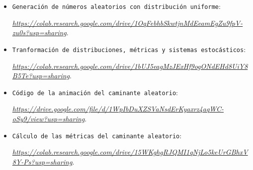\documentclass[11pt]{article} %
\begin{document}
\begin{itemize}
	\item \texttt{Generación de números aleatorios con distribución uniforme}:
	
	\href{https://colab.research.google.com/drive/1OqFebhbSkwtjnMdEeamEgZu9fpV-zu0s?usp=sharing}{\textit{https://colab.research.google.com/drive/1OqFebhbSkwtjnMdEeamEgZu9fpV-zu0s?usp=sharing}}.
	
	
	\item \texttt{Tranformación de distribuciones, métricas y sistemas estocásticos}:
	
	\href{https://colab.research.google.com/drive/1bUJ5eagMzJExHf9ogONdEHd8UiY8B5Te?usp=sharing}{\textit{https://colab.research.google.com/drive/1bUJ5eagMzJExHf9ogONdEHd8UiY8B5Te?usp=sharing}}.
	
	
	\item \texttt{Código de la animación del caminante aleatorio}:
	
	\href{https://drive.google.com/file/d/1WpIbDuXZSVaNsdErKyaxrz4aqWC-oSy9/view?usp=sharing}{\textit{https://drive.google.com/file/d/1WpIbDuXZSVaNsdErKyaxrz4aqWC-oSy9/view?usp=sharing}}.
	
	
	\item \texttt{Cálculo de las métricas del caminante aleatorio}:
	
	\href{https://colab.research.google.com/drive/15WKghgRJQMI1qNjLo5keUrGBhxV8Y-Ps?usp=sharing}{\textit{https://colab.research.google.com/drive/15WKghgRJQMI1qNjLo5keUrGBhxV8Y-Ps?usp=sharing}}.
\end{itemize}
\end{document}
